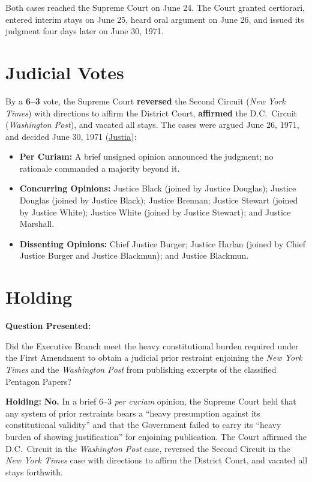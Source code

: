 \documentclass[12pt]{article}
\begin{document}
Both cases reached the Supreme Court on June 24. The Court granted certiorari, entered interim stays on June 25, heard oral argument on June 26, and issued its judgment four days later on June 30, 1971.

\section{Judicial Votes}
By a \textbf{6--3} vote, the Supreme Court \textbf{reversed} the Second Circuit (\textit{New York Times}) with directions to affirm the District Court, \textbf{affirmed} the D.C.\ Circuit (\textit{Washington Post}), and vacated all stays. The cases were argued June 26, 1971, and decided June 30, 1971 (\href{https://supreme.justia.com/cases/federal/us/403/713/}{Justia}):

\begin{itemize}
    \item \textbf{Per Curiam:} A brief unsigned opinion announced the judgment; no rationale commanded a majority beyond it.
    \item \textbf{Concurring Opinions:} Justice Black (joined by Justice Douglas); Justice Douglas (joined by Justice Black); Justice Brennan; Justice Stewart (joined by Justice White); Justice White (joined by Justice Stewart); and Justice Marshall.
    \item \textbf{Dissenting Opinions:} Chief Justice Burger; Justice Harlan (joined by Chief Justice Burger and Justice Blackmun); and Justice Blackmun.
\end{itemize}

\section{Holding}
\textbf{Question Presented:}

Did the Executive Branch meet the heavy constitutional burden required under the First Amendment to obtain a judicial prior restraint enjoining the \textit{New York Times} and the \textit{Washington Post} from publishing excerpts of the classified Pentagon Papers?

\textbf{Holding:} \textbf{No.} In a brief 6--3 \textit{per curiam} opinion, the Supreme Court held that any system of prior restraints bears a ``heavy presumption against its constitutional validity'' and that the Government failed to carry its ``heavy burden of showing justification'' for enjoining publication. The Court affirmed the D.C.\ Circuit in the \textit{Washington Post} case, reversed the Second Circuit in the \textit{New York Times} case with directions to affirm the District Court, and vacated all stays forthwith.
\end{document}

